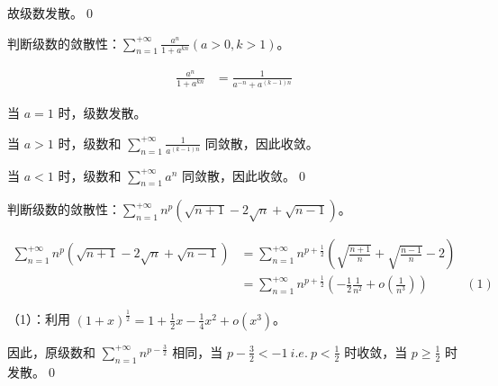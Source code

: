 故级数发散。\qed 



\begin{ques}
	判断级数的敛散性：$\displaystyle \sum _{n=1}^{+\infty }\frac{a^{n}}{1+a^{kn}}( a >0,k >1)$。
\end{ques}


\begin{align*}
	\frac{a^{n}}{1+a^{kn}} & =\frac{1}{a^{-n} +a^{( k-1) n}}
\end{align*}


当 $\displaystyle a=1$ 时，级数发散。

当 $\displaystyle a >1$ 时，级数和 $\displaystyle \sum _{n=1}^{+\infty }\frac{1}{a^{( k-1) n}}$ 同敛散，因此收敛。

当 $\displaystyle a< 1$ 时，级数和 $\displaystyle \sum _{n=1}^{+\infty } a^{n}$ 同敛散，因此收敛。\qed 





\begin{ques}
	判断级数的敛散性：$\displaystyle \sum _{n=1}^{+\infty } n^{p}\left(\sqrt{n+1} -2\sqrt{n} +\sqrt{n-1}\right)$。
\end{ques}




\begin{align*}
	\sum _{n=1}^{+\infty } n^{p}\left(\sqrt{n+1} -2\sqrt{n} +\sqrt{n-1}\right) & =\sum _{n=1}^{+\infty } n^{p+\frac{1}{2}}\left(\sqrt{\frac{n+1}{n}} +\sqrt{\frac{n-1}{n}} -2\right) & \\
	& =\sum _{n=1}^{+\infty } n^{p+\frac{1}{2}}\left( -\frac{1}{2}\frac{1}{n^{2}} +o\left(\frac{1}{n^{3}}\right)\right) & ( 1)
\end{align*}


（1）：利用 $\displaystyle ( 1+x)^{\frac{1}{2}} =1+\frac{1}{2} x-\frac{1}{4} x^{2} +o\left( x^{3}\right)$。

因此，原级数和 $\displaystyle \sum _{n=1}^{+\infty } n^{p-\frac{3}{2}}$ 相同，当 $\displaystyle p-\frac{3}{2} < -1\ i.e.\ p< \frac{1}{2}$ 时收敛，当 $\displaystyle p\geqslant \frac{1}{2}$ 时发散。\qed 
\ifx\allfiles\undefined

\fi